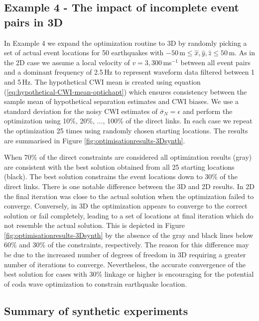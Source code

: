\documentclass[12pt,double]{article}
\begin{document}
\subsection*{Example 4 - The impact of incomplete event pairs in 3D}

In Example 4 we expand the optimization routine to 3D by randomly
picking
 a set of actual event locations for 50 earthquakes with
$-50$\,m$\leq \hat{x},\hat{y},\hat{z} \leq 50$\,m. As in the 2D case
we assume a local velocity of $v=3,300\,$ms$^{-1}$ between all event
pairs and a dominant frequency of 2.5$\,$Hz to represent
 waveform data filtered between 1 and 5$\,$Hz.
The hypothetical CWI mean is created using equation
(\ref{eq:hypothetical-CWI-mean-optichapt}) which ensures consistency
between the sample mean of hypothetical separation estimates and CWI
biases. We use a standard deviation for the noisy CWI estimates of
$\bar{\sigma}_N = \epsilon$ and perform the optimization
using 10\%, 20\%, ..., 100\% of the direct links. In each case we
repeat the optimization 25 times using randomly chosen starting
locations. The results are summarised in Figure
\ref{fig:optimisationresults-3Dsynth}.


When 70\% of the direct constraints are considered all optimization
results (gray) are consistent with the best solution obtained from
all 25 starting locations (black). The
best solution constrains the event locations down to 30\% of the
direct links. There is one notable difference between the 3D and 2D results. In 2D
the final iteration was close to the actual solution when the
optimization failed to converge. Conversely, in 3D the optimization
appears to converge to the correct solution or fail completely,
leading to a set of locations at final iteration which do not
resemble the actual solution. This is depicted in Figure
\ref{fig:optimisationresults-3Dsynth} by the absence of the gray and
black lines below 60\% and 30\% of the constraints, respectively.
The reason for this difference may be due to the increased number of
degrees of freedom in 3D requiring a greater number of iterations to
converge. Nevertheless, the accurate convergence of the best
solution for cases with 30\% linkage or higher is encouraging for
the potential of coda wave optimization to constrain earthquake
location.

\subsection*{Summary of synthetic experiments}
\end{document}
